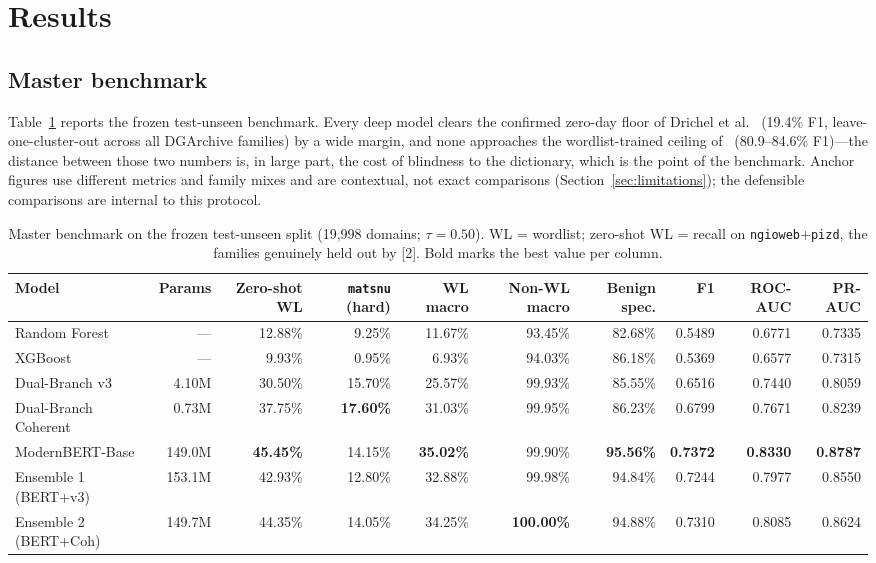 \documentclass[conference]{IEEEtran}
\begin{document}
\section{Results}
\label{sec:results}
\subsection{Master benchmark}
Table~\ref{tab:master} reports the frozen test-unseen benchmark. Every deep model clears the confirmed zero-day floor of Drichel et al.~\cite{drichel2022} (19.4\% F1, leave-one-cluster-out across all DGArchive families) by a wide margin, and none approaches the wordlist-trained ceiling of~\cite{leyva2026} (80.9--84.6\% F1)---the distance between those two numbers is, in large part, the cost of blindness to the dictionary, which is the point of the benchmark. Anchor figures use different metrics and family mixes and are contextual, not exact comparisons (Section~\ref{sec:limitations}); the defensible comparisons are internal to this protocol.

\begin{table}[t]
\centering
\caption{Master benchmark on the frozen test-unseen split (19{,}998 domains; $\tau = 0.50$). WL = wordlist; zero-shot WL = recall on \texttt{ngioweb}+\texttt{pizd}, the families genuinely held out by [2]. Bold marks the best value per column.}
\label{tab:master}
\footnotesize
\setlength{\tabcolsep}{4.5pt}
\begin{tabular}{@{}lrrrrrrrrr@{}}
\toprule
Model & Params & Zero-shot WL & \texttt{matsnu} (hard) & WL macro & Non-WL macro & Benign spec. & F1 & ROC-AUC & PR-AUC \\
\midrule
Random Forest & --- & 12.88\% & 9.25\% & 11.67\% & 93.45\% & 82.68\% & 0.5489 & 0.6771 & 0.7335 \\
XGBoost & --- & 9.93\% & 0.95\% & 6.93\% & 94.03\% & 86.18\% & 0.5369 & 0.6577 & 0.7315 \\
Dual-Branch v3 & 4.10M & 30.50\% & 15.70\% & 25.57\% & 99.93\% & 85.55\% & 0.6516 & 0.7440 & 0.8059 \\
Dual-Branch Coherent & 0.73M & 37.75\% & \textbf{17.60\%} & 31.03\% & 99.95\% & 86.23\% & 0.6799 & 0.7671 & 0.8239 \\
ModernBERT-Base & 149.0M & \textbf{45.45\%} & 14.15\% & \textbf{35.02\%} & 99.90\% & \textbf{95.56\%} & \textbf{0.7372} & \textbf{0.8330} & \textbf{0.8787} \\
Ensemble 1 (BERT+v3) & 153.1M & 42.93\% & 12.80\% & 32.88\% & 99.98\% & 94.84\% & 0.7244 & 0.7977 & 0.8550 \\
Ensemble 2 (BERT+Coh) & 149.7M & 44.35\% & 14.05\% & 34.25\% & \textbf{100.00\%} & 94.88\% & 0.7310 & 0.8085 & 0.8624 \\
\bottomrule
\end{tabular}
\end{table}
\end{document}
